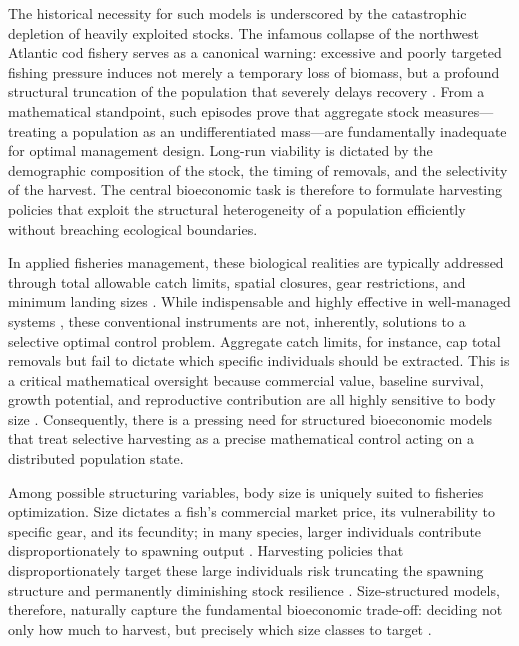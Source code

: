 \documentclass[pdflatex,sn-mathphys-num]{sn-jnl}
\theoremstyle{thmstyleone}
\theoremstyle{definition}
\theoremstyle{remark}
\begin{document}
The historical necessity for such models is underscored by the catastrophic depletion of heavily exploited stocks. The infamous collapse of the northwest Atlantic cod fishery serves as a canonical warning: excessive and poorly targeted fishing pressure induces not merely a temporary loss of biomass, but a profound structural truncation of the population that severely delays recovery \cite{fao_state_2022,myers_why_1997,hutchings_collapse_2000,liang2025global}. From a mathematical standpoint, such episodes prove that aggregate stock measures—treating a population as an undifferentiated mass—are fundamentally inadequate for optimal management design. Long-run viability is dictated by the demographic composition of the stock, the timing of removals, and the selectivity of the harvest. The central bioeconomic task is therefore to formulate harvesting policies that exploit the structural heterogeneity of a population efficiently without breaching ecological boundaries.

In applied fisheries management, these biological realities are typically addressed through total allowable catch limits, spatial closures, gear restrictions, and minimum landing sizes \cite{agardy_mind_2011,broadhurst_estimating_2006,yu2026beyond,costello_can_2008,hilborn_quantitative_1992,wang2026algebraic}. While indispensable and highly effective in well-managed systems \cite{hilborn_effective_2020,wang2026damage}, these conventional instruments are not, inherently, solutions to a selective optimal control problem. Aggregate catch limits, for instance, cap total removals but fail to dictate which specific individuals should be extracted. This is a critical mathematical oversight because commercial value, baseline survival, growth potential, and reproductive contribution are all highly sensitive to body size \cite{birkeland_importance_2005}. Consequently, there is a pressing need for structured bioeconomic models that treat selective harvesting as a precise mathematical control acting on a distributed population state.

Among possible structuring variables, body size is uniquely suited to fisheries optimization.
Size dictates a fish's commercial market price, its vulnerability to specific gear, and its fecundity;
in many species, larger individuals contribute disproportionately to spawning output \cite{yildiz_bio-economic_2023,yu2026rigorous,hixon_boffffs_2014,barneche_fish_2018}. 
Harvesting policies that disproportionately target these large individuals risk truncating the spawning structure and permanently diminishing stock resilience \cite{anderson_why_2008}. Size-structured models, therefore, naturally capture the fundamental bioeconomic trade-off: deciding not only how much to harvest, but precisely which size classes to target \cite{guiet_boatsv2_2024,xia_multispecies_2021}.
\end{document}
